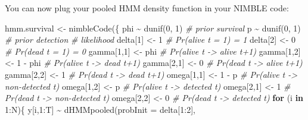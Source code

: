 \documentclass[
  12pt,
]{krantz}
\newenvironment{Shaded}{\begin{snugshade}}{\end{snugshade}}
\newcommand{\AttributeTok}[1]{\textcolor[rgb]{0.77,0.63,0.00}{#1}}
\newcommand{\CommentTok}[1]{\textcolor[rgb]{0.56,0.35,0.01}{\textit{#1}}}
\newcommand{\ControlFlowTok}[1]{\textcolor[rgb]{0.13,0.29,0.53}{\textbf{#1}}}
\newcommand{\DecValTok}[1]{\textcolor[rgb]{0.00,0.00,0.81}{#1}}
\newcommand{\FunctionTok}[1]{\textcolor[rgb]{0.00,0.00,0.00}{#1}}
\newcommand{\NormalTok}[1]{#1}
\newcommand{\OtherTok}[1]{\textcolor[rgb]{0.56,0.35,0.01}{#1}}
\newcommand{\SpecialCharTok}[1]{\textcolor[rgb]{0.00,0.00,0.00}{#1}}
\begin{document}
You can now plug your pooled HMM density function in your NIMBLE code:

\begin{Shaded}
\begin{Highlighting}[]
\NormalTok{hmm.survival }\OtherTok{\textless{}{-}} \FunctionTok{nimbleCode}\NormalTok{(\{}
\NormalTok{  phi }\SpecialCharTok{\textasciitilde{}} \FunctionTok{dunif}\NormalTok{(}\DecValTok{0}\NormalTok{, }\DecValTok{1}\NormalTok{) }\CommentTok{\# prior survival}
\NormalTok{  p }\SpecialCharTok{\textasciitilde{}} \FunctionTok{dunif}\NormalTok{(}\DecValTok{0}\NormalTok{, }\DecValTok{1}\NormalTok{) }\CommentTok{\# prior detection}
  \CommentTok{\# likelihood}
\NormalTok{  delta[}\DecValTok{1}\NormalTok{] }\OtherTok{\textless{}{-}} \DecValTok{1}          \CommentTok{\# Pr(alive t = 1) = 1}
\NormalTok{  delta[}\DecValTok{2}\NormalTok{] }\OtherTok{\textless{}{-}} \DecValTok{0}          \CommentTok{\# Pr(dead t = 1) = 0}
\NormalTok{  gamma[}\DecValTok{1}\NormalTok{,}\DecValTok{1}\NormalTok{] }\OtherTok{\textless{}{-}}\NormalTok{ phi      }\CommentTok{\# Pr(alive t {-}\textgreater{} alive t+1)}
\NormalTok{  gamma[}\DecValTok{1}\NormalTok{,}\DecValTok{2}\NormalTok{] }\OtherTok{\textless{}{-}} \DecValTok{1} \SpecialCharTok{{-}}\NormalTok{ phi  }\CommentTok{\# Pr(alive t {-}\textgreater{} dead t+1)}
\NormalTok{  gamma[}\DecValTok{2}\NormalTok{,}\DecValTok{1}\NormalTok{] }\OtherTok{\textless{}{-}} \DecValTok{0}        \CommentTok{\# Pr(dead t {-}\textgreater{} alive t+1)}
\NormalTok{  gamma[}\DecValTok{2}\NormalTok{,}\DecValTok{2}\NormalTok{] }\OtherTok{\textless{}{-}} \DecValTok{1}        \CommentTok{\# Pr(dead t {-}\textgreater{} dead t+1)}
\NormalTok{  omega[}\DecValTok{1}\NormalTok{,}\DecValTok{1}\NormalTok{] }\OtherTok{\textless{}{-}} \DecValTok{1} \SpecialCharTok{{-}}\NormalTok{ p    }\CommentTok{\# Pr(alive t {-}\textgreater{} non{-}detected t)}
\NormalTok{  omega[}\DecValTok{1}\NormalTok{,}\DecValTok{2}\NormalTok{] }\OtherTok{\textless{}{-}}\NormalTok{ p        }\CommentTok{\# Pr(alive t {-}\textgreater{} detected t)}
\NormalTok{  omega[}\DecValTok{2}\NormalTok{,}\DecValTok{1}\NormalTok{] }\OtherTok{\textless{}{-}} \DecValTok{1}        \CommentTok{\# Pr(dead t {-}\textgreater{} non{-}detected t)}
\NormalTok{  omega[}\DecValTok{2}\NormalTok{,}\DecValTok{2}\NormalTok{] }\OtherTok{\textless{}{-}} \DecValTok{0}        \CommentTok{\# Pr(dead t {-}\textgreater{} detected t)}
  \ControlFlowTok{for}\NormalTok{ (i }\ControlFlowTok{in} \DecValTok{1}\SpecialCharTok{:}\NormalTok{N)\{}
\NormalTok{    y[i,}\DecValTok{1}\SpecialCharTok{:}\NormalTok{T] }\SpecialCharTok{\textasciitilde{}} \FunctionTok{dHMMpooled}\NormalTok{(}\AttributeTok{probInit =}\NormalTok{ delta[}\DecValTok{1}\SpecialCharTok{:}\DecValTok{2}\NormalTok{], }

\end{Highlighting}
\end{Shaded}
\end{document}
